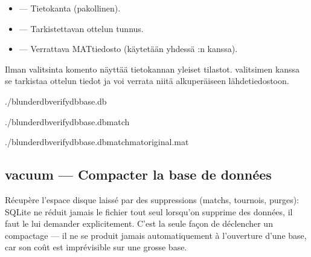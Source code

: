 \documentclass[letterpaper,10pt,finnish]{sphinxmanual}
\begin{document}
\sphinxAtStartPar
{}
\begin{itemize}
\item {} 
\sphinxAtStartPar
{} — Tietokanta (pakollinen).

\item {} 
\sphinxAtStartPar
{} — Tarkistettavan ottelun tunnus.

\item {} 
\sphinxAtStartPar
{} — Verrattava MAT\sphinxhyphen{}tiedosto (käytetään yhdessä :n kanssa).

\end{itemize}

\sphinxAtStartPar
Ilman \sphinxhyphen{}valitsinta komento näyttää tietokannan yleiset tilastot. \sphinxhyphen{}valitsimen kanssa se tarkistaa ottelun tiedot ja voi verrata niitä alkuperäiseen lähdetiedostoon.

\sphinxAtStartPar
{}

\begin{sphinxVerbatim}[commandchars=\\\{\}]
./blunderdbverify\PYGZhy{}\PYGZhy{}dbbase.db

./blunderdbverify\PYGZhy{}\PYGZhy{}dbbase.db\PYGZhy{}\PYGZhy{}match

./blunderdbverify\PYGZhy{}\PYGZhy{}dbbase.db\PYGZhy{}\PYGZhy{}match\PYGZhy{}\PYGZhy{}matoriginal.mat
\end{sphinxVerbatim}


\subsection{vacuum — Compacter la base de données}
\label{\detokenize{cli:vacuum-compacter-la-base-de-donnees}}
\sphinxAtStartPar
Récupère l’espace disque laissé par des suppressions (matchs, tournois,
purges): SQLite ne réduit jamais le fichier tout seul lorsqu’on supprime des
données, il faut le lui demander explicitement. C’est la seule façon de
déclencher un compactage — il ne se produit jamais automatiquement à
l’ouverture d’une base, car son coût est imprévisible sur une grosse base.
\end{document}
